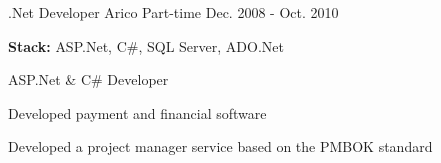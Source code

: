 \begin{cventries}

\cventry
{.Net Developer} %
{Arico} %
{Part-time} %
{Dec. 2008 - Oct. 2010} %
{ %
{\textbf{ Stack:} }{ASP.Net, C\#, SQL Server, ADO.Net}
\break
\begin{cvitems}
\item {ASP.Net \& C\# Developer}
\item {Developed payment and financial software}
\item {Developed a project manager service based on the PMBOK standard}
\end{cvitems}
}

\end{cventries}